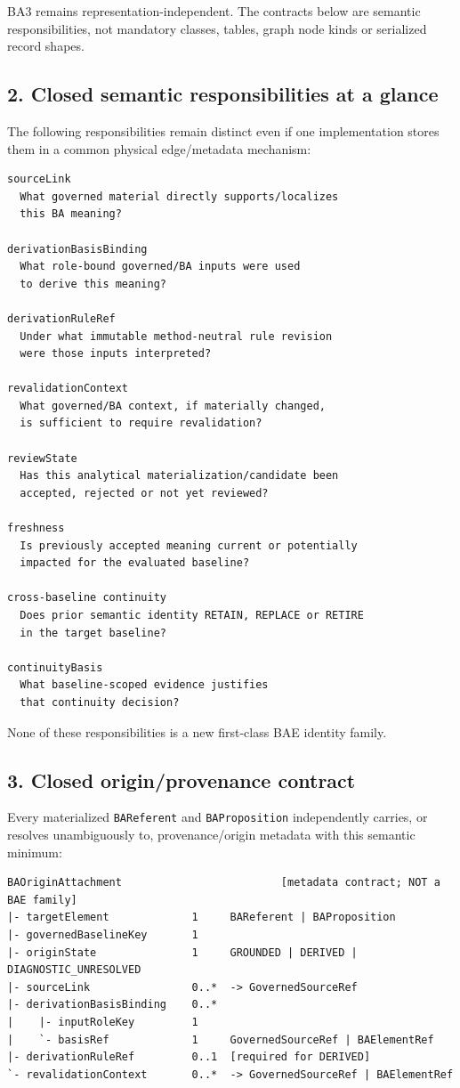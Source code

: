\documentclass[11pt,a4paper]{article}
\begin{document}
BA3 remains representation-independent. The contracts below are semantic responsibilities, not mandatory classes, tables, graph node kinds or serialized record shapes.

\subsection{2. Closed semantic responsibilities at a glance}\label{closed-semantic-responsibilities-at-a-glance}

The following responsibilities remain distinct even if one implementation stores them in a common physical edge/metadata mechanism:

\begin{verbatim}
sourceLink
  What governed material directly supports/localizes
  this BA meaning?

derivationBasisBinding
  What role-bound governed/BA inputs were used
  to derive this meaning?

derivationRuleRef
  Under what immutable method-neutral rule revision
  were those inputs interpreted?

revalidationContext
  What governed/BA context, if materially changed,
  is sufficient to require revalidation?

reviewState
  Has this analytical materialization/candidate been
  accepted, rejected or not yet reviewed?

freshness
  Is previously accepted meaning current or potentially
  impacted for the evaluated baseline?

cross-baseline continuity
  Does prior semantic identity RETAIN, REPLACE or RETIRE
  in the target baseline?

continuityBasis
  What baseline-scoped evidence justifies
  that continuity decision?
\end{verbatim}

None of these responsibilities is a new first-class BAE identity family.

\subsection{3. Closed origin/provenance contract}\label{closed-originprovenance-contract}

Every materialized \texttt{BAReferent} and \texttt{BAProposition} independently carries, or resolves unambiguously to, provenance/origin metadata with this semantic minimum:

\begin{verbatim}
BAOriginAttachment                         [metadata contract; NOT a BAE family]
|- targetElement             1     BAReferent | BAProposition
|- governedBaselineKey       1
|- originState               1     GROUNDED | DERIVED | DIAGNOSTIC_UNRESOLVED
|- sourceLink                0..*  -> GovernedSourceRef
|- derivationBasisBinding    0..*
|    |- inputRoleKey         1
|    `- basisRef             1     GovernedSourceRef | BAElementRef
|- derivationRuleRef         0..1  [required for DERIVED]
`- revalidationContext       0..*  -> GovernedSourceRef | BAElementRef
\end{verbatim}
\end{document}
